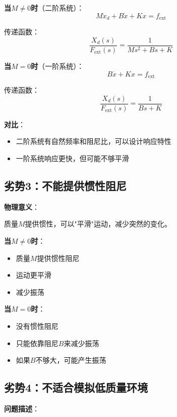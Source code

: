 \documentclass[12pt,a4paper]{article}
\begin{document}
\textbf{当$M \neq 0$时}（二阶系统）：
\begin{equation}
M\ddot{x}_d + B\dot{x} + Kx = f_{\text{ext}}
\end{equation}

传递函数：
\begin{equation}
\frac{X_d(s)}{F_{\text{ext}}(s)} = \frac{1}{Ms^2 + Bs + K}
\end{equation}

\textbf{当$M = 0$时}（一阶系统）：
\begin{equation}
B\dot{x} + Kx = f_{\text{ext}}
\end{equation}

传递函数：
\begin{equation}
\frac{X_d(s)}{F_{\text{ext}}(s)} = \frac{1}{Bs + K}
\end{equation}

\textbf{对比}：
\begin{itemize}
\item 二阶系统有自然频率和阻尼比，可以设计响应特性
\item 一阶系统响应更快，但可能不够平滑
\end{itemize}

\subsection{劣势3：不能提供惯性阻尼}

\textbf{物理意义}：

质量$M$提供惯性，可以"平滑"运动，减少突然的变化。

\textbf{当$M \neq 0$时}：
\begin{itemize}
\item 质量$M$提供惯性阻尼
\item 运动更平滑
\item 减少振荡
\end{itemize}

\textbf{当$M = 0$时}：
\begin{itemize}
\item 没有惯性阻尼
\item 只能依靠阻尼$B$来减少振荡
\item 如果$B$不够大，可能产生振荡
\end{itemize}

\subsection{劣势4：不适合模拟低质量环境}

\textbf{问题描述}：
\end{document}
